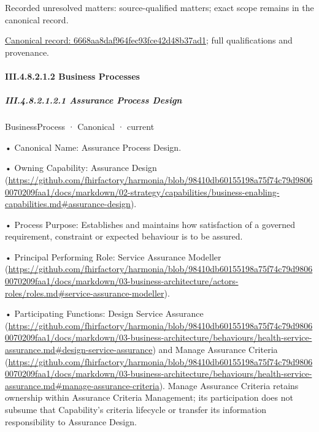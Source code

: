 {\small Recorded unresolved matters: source-qualified matters; exact scope remains in the canonical record.}\par
{\footnotesize \href{../../../../continuum/business/business-function/6668aa8daf964fec93fce42d48b37ad1.md}{Canonical record: 6668aa8daf964fec93fce42d48b37ad1}; full qualifications and provenance.}\par
\paragraph*{III.4.8.2.1.2 Business Processes}
\label{navigation:III.4.8.2.1.2}

\subparagraph*{III.4.8.2.1.2.1 Assurance Process Design}
\label{navigation:III.4.8.2.1.2.1}

\label{element:aec3177dcdd84961814f2ba4f688ad33}
{\small BusinessProcess · Canonical · current}\par

•
Canonical Name: Assurance Process Design.



•
Owning Capability: Assurance Design (\url{https://github.com/fhirfactory/harmonia/blob/98410db60155198a75f74c79d98060070209faa1/docs/markdown/02-strategy/capabilities/business-enabling-capabilities.md#assurance-design}).



•
Process Purpose: Establishes and maintains how satisfaction of a governed requirement, constraint or expected behaviour is to be assured.



•
Principal Performing Role: Service Assurance Modeller (\url{https://github.com/fhirfactory/harmonia/blob/98410db60155198a75f74c79d98060070209faa1/docs/markdown/03-business-architecture/actors-roles/roles.md#service-assurance-modeller}).



•
Participating Functions: Design Service Assurance (\url{https://github.com/fhirfactory/harmonia/blob/98410db60155198a75f74c79d98060070209faa1/docs/markdown/03-business-architecture/behaviours/health-service-assurance.md#design-service-assurance}) and Manage Assurance Criteria (\url{https://github.com/fhirfactory/harmonia/blob/98410db60155198a75f74c79d98060070209faa1/docs/markdown/03-business-architecture/behaviours/health-service-assurance.md#manage-assurance-criteria}). Manage Assurance Criteria retains ownership within Assurance Criteria Management; its participation does not subsume that Capability's criteria lifecycle or transfer its information responsibility to Assurance Design.



